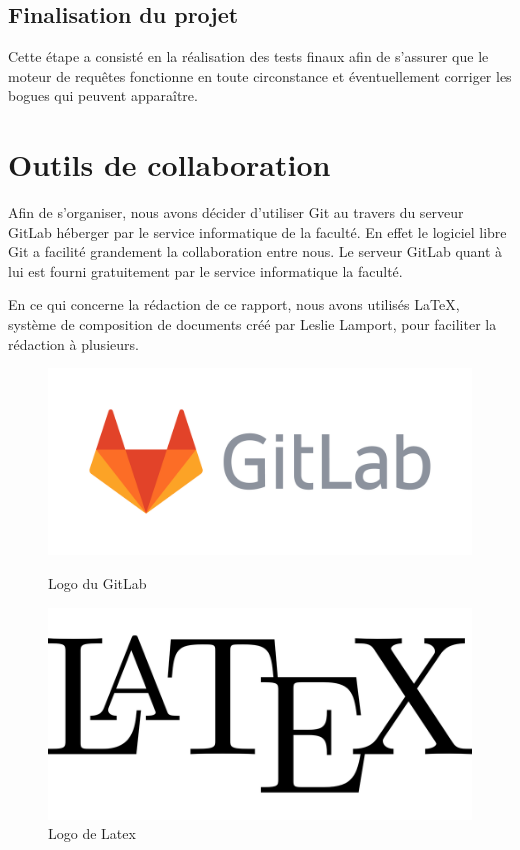 \documentclass[oneside,13pt,a4paper]{report}
\begin{document}
\subsection{Finalisation du projet}

Cette étape a consisté en la réalisation des tests finaux afin de s’assurer que le moteur de requêtes fonctionne en toute circonstance et éventuellement corriger les bogues qui peuvent apparaître.

\section{Outils de collaboration}

Afin de s’organiser, nous avons décider d’utiliser Git au travers du serveur GitLab héberger par le service informatique de la faculté. En effet le logiciel libre Git a facilité grandement la collaboration entre nous. Le serveur GitLab quant à lui est fourni gratuitement par le service informatique la faculté.

En ce qui concerne la rédaction de ce rapport, nous avons utilisés \LaTeX, système de composition de documents créé par Leslie Lamport, pour faciliter la rédaction à plusieurs.

\begin{figure}[h]
	\begin{minipage}[c]{.46\linewidth}
		\centering
		\includegraphics[width=1\textwidth]{img/gitlab.png}
		\caption{Logo du GitLab}
	\end{minipage}
	\hfill%
	\begin{minipage}[c]{.46\linewidth}
		\centering
		\includegraphics[width=1\textwidth]{img/latex.png}
		\caption{Logo de Latex}
	\end{minipage}
\end{figure}
\end{document}
